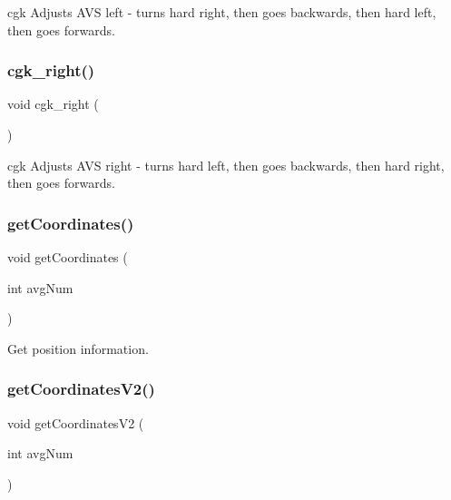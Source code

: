 cgk Adjusts A\+VS left -\/ turns hard right, then goes backwards, then hard left, then goes forwards. 

\mbox{\label{bot_main_8ino_ad995d8479412ad51f45bebe8e1c8c96e}} 
\subsubsection{\texorpdfstring{cgk\+\_\+right()}{cgk\_right()}}
{\footnotesize\ttfamily void cgk\+\_\+right (\begin{DoxyParamCaption}{ }\end{DoxyParamCaption})}



cgk Adjusts A\+VS right -\/ turns hard left, then goes backwards, then hard right, then goes forwards. 

\mbox{\label{bot_main_8ino_a0a52ea394eae088c805441c570ab15bb}} 
\subsubsection{\texorpdfstring{get\+Coordinates()}{getCoordinates()}}
{\footnotesize\ttfamily void get\+Coordinates (\begin{DoxyParamCaption}\item[{int}]{avg\+Num }\end{DoxyParamCaption})}



Get position information. 

\mbox{\label{bot_main_8ino_a71fd924d62ee6af82d3d5cd64004505b}} 
\subsubsection{\texorpdfstring{get\+Coordinates\+V2()}{getCoordinatesV2()}}
{\footnotesize\ttfamily void get\+Coordinates\+V2 (\begin{DoxyParamCaption}\item[{int}]{avg\+Num }\end{DoxyParamCaption})}



